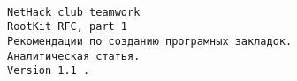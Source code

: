 \begin{thebibliography}{99}

\begin{verbatim}

NetHack club teamwork
RootKit RFC, part 1
Рекомендации по созданию програмных закладок.
Аналитическая статья.
Version 1.1 .

\end{verbatim}


\end{thebibliography}
